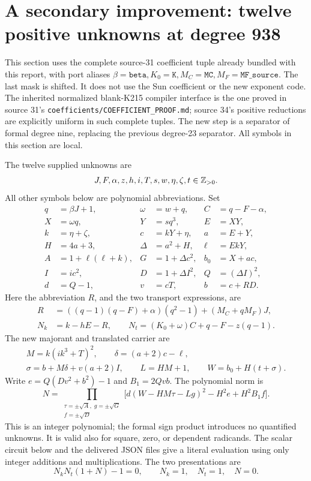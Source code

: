 \section{A secondary improvement: twelve positive unknowns at degree 938}
\label{sec:positive-majorant}

This section uses the complete source-31 coefficient tuple already bundled
with this report, with port aliases
\(\beta=\texttt{beta},K_0=\texttt{K},M_C=\texttt{MC},
M_F=\texttt{MF\_source}\). The last mask is shifted. It does not use the
Sun coefficient or the new exponent code. The inherited normalized
blank-K215 compiler interface is the one proved in source 31's
\texttt{coefficients/COEFFICIENT\_PROOF.md}; source 34's positive reductions
are explicitly uniform in such complete tuples. The new step is a
separator of formal degree nine, replacing the previous degree-23
separator. All symbols in this section are local.

The twelve supplied unknowns are
\[
J,F,\alpha,z,h,i,T,s,w,\eta,\zeta,t\in\mathbb Z_{>0}.
\]
All other symbols below are polynomial abbreviations. Set
\begin{align*}
q&=\beta J+1,&\omega&=w+q,&C&=q-F-\alpha,\\
X&=\omega q,&Y&=sq^3,&E&=XY,\\
k&=\eta+\zeta,&c&=kY+\eta,&a&=E+Y,\\
H&=4a+3,&\Delta&=a^2+H,&\ell&=EkY,\\
A&=1+\ell(\ell+k),&G&=1+\Delta c^2,&b_0&=X+ac,\\
I&=ic^2,&D&=1+\Delta I^2,&Q&=(\Delta I)^2,\\
d&=Q-1,&v&=cT,&b&=c+RD.
\end{align*}
Here the abbreviation \(R\), and the two transport expressions, are
\begin{align*}
R&=((q-1)(q-F)+\alpha)(q^2-1)+(M_C+qM_F)J,\\
N_k&=k-hE-R,\qquad
N_t=(K_0+\omega)C+q-F-z(q-1).
\end{align*}
The new majorant and translated carrier are
\begin{gather*}
\boxed{M=k(ik^3+T)^2},\qquad \delta=(a+2)c-\ell,\\
\sigma=b+M\delta+v(a+2)I,\qquad
L=HM+1,\qquad W=b_0+H(t+\sigma).
\end{gather*}
Write \(e=Q(Dv^2+b^2)-1\) and \(B_1=2Qvb\). The polynomial norm is
\begin{equation}
N=\prod_{\substack{\tau=\pm\sqrt A,\;g=\pm\sqrt G\\f=\pm\sqrt D}}
\bigl[d(W-HM\tau-Lg)^2-H^2e+H^2B_1f\bigr].
\label{eq:positive-newnorm}
\end{equation}
This is an integer polynomial; the formal sign product introduces no
quantified unknowns. It is valid also for square, zero, or dependent
radicands. The scalar circuit below and the delivered JSON files give
a literal evaluation using only integer additions and multiplications.
The two presentations are
\begin{equation}
\boxed{N_kN_t(1+N)-1=0},\qquad
\boxed{N_k=1,\quad N_t=1,\quad N=0}.
\label{eq:positive-presentations}
\end{equation}

